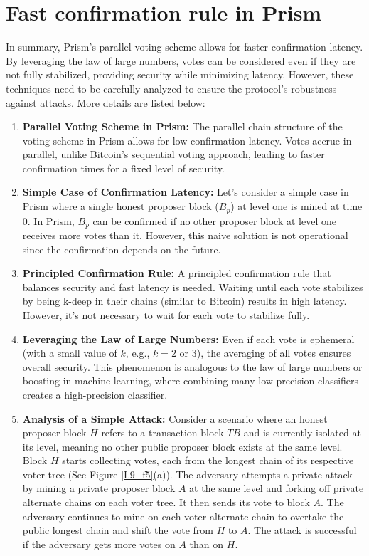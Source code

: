 \section{Fast confirmation rule in Prism}
In summary, Prism's parallel voting scheme allows for faster confirmation latency. By leveraging the law of large numbers, votes can be considered even if they are not fully stabilized, providing security while minimizing latency. However, these techniques need to be carefully analyzed to ensure the protocol's robustness against attacks. More details are listed below:
\begin{enumerate}
	\item \textbf{Parallel Voting Scheme in Prism:} The parallel chain structure of the voting scheme in Prism allows for low confirmation latency. Votes accrue in parallel, unlike Bitcoin's sequential voting approach, leading to faster confirmation times for a fixed level of security.
	\item \textbf{Simple Case of Confirmation Latency:} Let's consider a simple case in Prism where a single honest proposer block ($B_{p}$) at level one is mined at time $0$. In Prism, $B_{p}$ can be confirmed if no other proposer block at level one receives more votes than it. However, this naive solution is not operational since the confirmation depends on the future.
	\item \textbf{Principled Confirmation Rule:} A principled confirmation rule that balances security and fast latency is needed. Waiting until each vote stabilizes by being k-deep in their chains (similar to Bitcoin) results in high latency. However, it's not necessary to wait for each vote to stabilize fully.
	\item \textbf{Leveraging the Law of Large Numbers:} Even if each vote is ephemeral (with a small value of $k$, e.g., $k = 2$ or $3$), the averaging of all votes ensures overall security. This phenomenon is analogous to the law of large numbers or boosting in machine learning, where combining many low-precision classifiers creates a high-precision classifier.
	\item \textbf{Analysis of a Simple Attack:} Consider a scenario where an honest proposer block $H$ refers to a transaction block $TB$ and is currently isolated at its level, meaning no other public proposer block exists at the same level. Block $H$ starts collecting votes, each from the longest chain of its respective voter tree (See Figure \ref{L9_f5}(a)). The adversary attempts a private attack by mining a private proposer block $A$ at the same level and forking off private alternate chains on each voter tree. It then sends its vote to block $A$. The adversary continues to mine on each voter alternate chain to overtake the public longest chain and shift the vote from $H$ to $A$. The attack is successful if the adversary gets more votes on $A$ than on $H$.
\end{enumerate}
